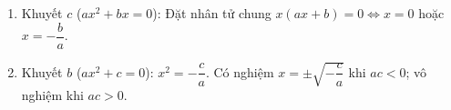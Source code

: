\begin{enumerate}
\item Khuyết $c$ ($ax^2 + bx = 0$): Đặt nhân tử chung $x(ax + b) = 0 \iff x = 0$ hoặc $x = -\dfrac{b}{a}$.
\item Khuyết $b$ ($ax^2 + c = 0$): $x^2 = -\dfrac{c}{a}$. Có nghiệm $x = \pm\sqrt{-\dfrac{c}{a}}$ khi $ac < 0$; vô nghiệm khi $ac > 0$.
\end{enumerate}
